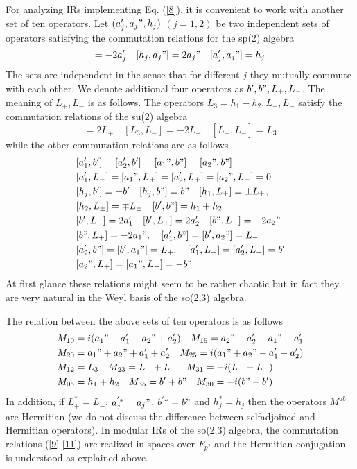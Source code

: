 \documentclass[a4paper,12pt]{article}%
\begin{document}
For analyzing IRs implementing Eq. (\ref{8}), it is convenient to
work with another set of ten operators. Let $(a_j',a_j",h_j)$ 
$(j=1,2)$ be two independent sets of operators satisfying the 
commutation relations for the sp(2) algebra
\begin{equation}
[h_j,a_j']=-2a_j'\quad [h_j,a_j"]=2a_j"\quad [a_j',a_j"]=h_j
\label{9}
\end{equation}
The sets are independent in the sense that
for different $j$ they mutually commute with each other. 
We denote additional four operators as $b', b",L_+,L_-$.
The meaning of $L_+,L_-$ is as follows. The operators 
$L_3=h_1-h_2,L_+,L_-$ satisfy the commutation relations
of the su(2) algebra
\begin{equation}
[L_3,L_+]=2L_+\quad [L_3,L_-]=-2L_-\quad [L_+,L_-]=L_3
\label{10}
\end{equation}
while the other commutation relations are as follows
\begin{eqnarray}
&[a_1',b']=[a_2',b']=[a_1",b"]=[a_2",b"]=\nonumber\\
&[a_1',L_-]=[a_1",L_+]=[a_2',L_+]=[a_2",L_-]=0\nonumber\\
&[h_j,b']=-b'\quad [h_j,b"]=b"\quad 
[h_1,L_{\pm}]=\pm L_{\pm},\nonumber\\
&[h_2,L_{\pm}]=\mp L_{\pm}\quad [b',b"]=h_1+h_2\nonumber\\
&[b',L_-]=2a_1'\quad [b',L_+]=2a_2'\quad [b",L_-]=-2a_2"\nonumber\\
&[b",L_+]=-2a_1",\quad [a_1',b"]=[b',a_2"]=L_-\nonumber\\
&[a_2',b"]=[b',a_1"]=L_+,\quad [a_1',L_+]=[a_2',L_-]=b'\nonumber\\
&[a_2",L_+]=[a_1",L_-]=-b"
\label{11}
\end{eqnarray}  
At first glance these relations might seem to be rather 
chaotic but in fact they are very natural in the Weyl basis
of the so(2,3) algebra. 

The relation between the above sets of ten operators is as follows
\begin{eqnarray}
&M_{10}=i(a_1"-a_1'-a_2"+a_2')\quad M_{15}=a_2"+a_2'-a_1"-a_1'\nonumber\\
&M_{20}=a_1"+a_2"+a_1'+a_2'\quad M_{25}=i(a_1"+a_2"-a_1'-a_2')\nonumber\\
&M_{12}=L_3\quad M_{23}=L_++L_-\quad M_{31}=-i(L_+-L_-)\nonumber\\
&M_{05}=h_1+h_2\quad M_{35}=b'+b"\quad M_{30}=-i(b"-b')
\label{12}
\end{eqnarray}
In addition, if 
$L_+^*=L_-$, $a_j^{'*}=a_j"$, $b^{'*}=b"$ and $h_j^*=h_j$ then
the operators $M^{ab}$ are Hermitian (we do not discuss the
difference between selfadjoined and Hermitian operators).   
In modular IRs of the so(2,3) algebra, the commutation relations 
(\ref{9}-\ref{11}) are realized in spaces over $F_{p^2}$
and the Hermitian conjugation is understood as explained above.
\end{document}
